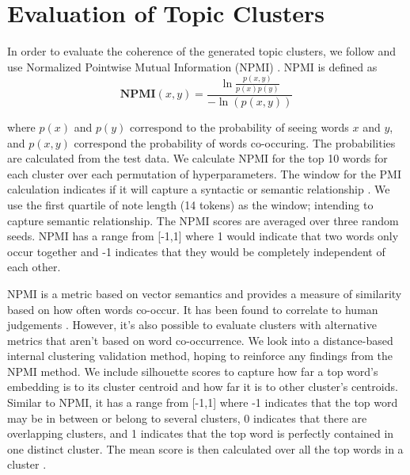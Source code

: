 \documentclass [11pt, proquest] {uwthesis}[2020/02/24]
\begin{document}
\chapter{Evaluation of Topic Clusters}

In order to evaluate the coherence of the generated topic clusters, we follow \cite{sia-etal-2020-tired} and use Normalized Pointwise Mutual Information (NPMI) \citep{bouma2009normalized}.   NPMI is defined as $$\textbf{NPMI}(x,y) = \frac{\ln\frac{p(x,y)}{p(x)p(y)}}{-\ln(p(x,y))}$$

where $p(x)$ and $p(y)$ correspond to the probability of seeing words $x$ and $y$, and $p(x,y)$ correspond the probability of words co-occuring. The probabilities are calculated from the test data. We calculate NPMI for  the top 10 words for each cluster over each permutation of hyperparameters. The window for the PMI calculation indicates if it will capture a syntactic or semantic relationship \citep{jurafsky_martin_2019}. We use the first quartile of note length (14 tokens) as the window; intending to capture semantic relationship. The NPMI scores are averaged over three random seeds.  NPMI has a range from [-1,1] where 1 would indicate that two words only occur together and -1 indicates that they would be completely independent of each other.

NPMI is a metric based on vector semantics and provides a measure of similarity based on how often words co-occur. It has been found to correlate to human judgements \citep{lau2014machine} . However, it's also possible to evaluate clusters with alternative metrics that aren't based on word co-occurrence. We look into a distance-based internal clustering validation method, hoping to  reinforce any findings from the NPMI method. We include silhouette scores \citep{liu2010understanding}  to capture how far a top word’s embedding is to its cluster centroid and how far it is to other cluster's centroids. Similar to NPMI, it has a range from [-1,1] where -1 indicates that the top word may be in between or belong to several clusters, 0 indicates that there are overlapping clusters, and 1 indicates that the top word is perfectly contained in one distinct cluster. The mean score is then calculated over all the top words in a cluster  \citep{scikit-learn}.
\end{document}
